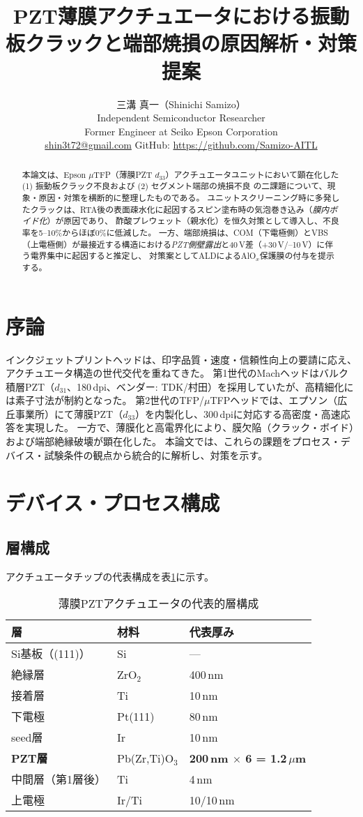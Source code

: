 \documentclass[11pt,a4paper]{ltjsarticle} %
\title{PZT薄膜アクチュエータにおける振動板クラックと端部焼損の原因解析・対策提案}
\author{三溝 真一（Shinichi Samizo）\\
Independent Semiconductor Researcher\\
Former Engineer at Seiko Epson Corporation\\
\href{mailto:shin3t72@gmail.com}{shin3t72@gmail.com}\quad
GitHub: \url{https://github.com/Samizo-AITL}}
\date{} %
\begin{document}
\maketitle

\begin{abstract}
本論文は、Epson $\mu$TFP（薄膜PZT $d_{33}$）アクチュエータユニットにおいて顕在化した
(1) 振動板クラック不良および (2) セグメント端部の焼損不良
の二課題について、現象・原因・対策を横断的に整理したものである。
ユニットスクリーニング時に多発したクラックは、RTA後の表面疎水化に起因するスピン塗布時の気泡巻き込み（\emph{膜内ボイド化}）が原因であり、
酢酸プレウェット（親水化）を恒久対策として導入し、不良率を5--10\%からほぼ0\%に低減した。
一方、端部焼損は、COM（下電極側）とVBS（上電極側）が最接近する構造における\emph{PZT側壁露出}と40\,V差（+30\,V/--10\,V）に伴う電界集中に起因すると推定し、
対策案としてALDによるAlO$_x$保護膜の付与を提示する。
\end{abstract}

\section{序論}
インクジェットプリントヘッドは、印字品質・速度・信頼性向上の要請に応え、アクチュエータ構造の世代交代を重ねてきた。
第1世代のMachヘッドはバルク積層PZT（$d_{31}$、180\,dpi、ベンダー: TDK/村田）を採用していたが、高精細化には素子寸法が制約となった。
第2世代のTFP/$\mu$TFPヘッドでは、エプソン（広丘事業所）にて薄膜PZT（$d_{33}$）を内製化し、300\,dpiに対応する高密度・高速応答を実現した。
一方で、薄膜化と高電界化により、膜欠陥（クラック・ボイド）および端部絶縁破壊が顕在化した。
本論文では、これらの課題をプロセス・デバイス・試験条件の観点から統合的に解析し、対策を示す。

\section{デバイス・プロセス構成}
\subsection{層構成}
アクチュエータチップの代表構成を表\ref{tab:stack}に示す。
\begin{table}[h]
  \centering
  \caption{薄膜PZTアクチュエータの代表的層構成}
  \label{tab:stack}
  \begin{tabular}{@{}lll@{}}
    \toprule
    層 & 材料 & 代表厚み \\\midrule
    Si基板（(111)） & Si & --- \\
    絶縁層 & ZrO$_2$ & 400\,nm \\
    接着層 & Ti & 10\,nm \\
    下電極 & Pt(111) & 80\,nm \\
    seed層 & Ir & 10\,nm \\
    \textbf{PZT層} & Pb(Zr,Ti)O$_3$ & \textbf{200\,nm $\times$ 6 = 1.2\,$\mu$m} \\
    中間層（第1層後） & Ti & 4\,nm \\
    上電極 & Ir/Ti & 10/10\,nm \\\bottomrule
  \end{tabular}
\end{table}
\end{document}
